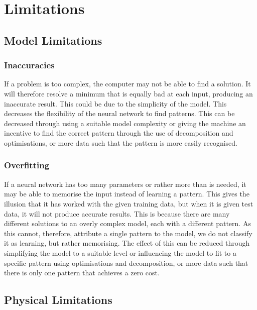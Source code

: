 
\section{Limitations}
\label{lim}

\subsection{Model Limitations}

\subsubsection{Inaccuracies}
\label{inacc}

If a problem is too complex, the computer may not be able to find a solution. It will therefore resolve a minimum that is equally bad at each input, producing an inaccurate result. This could be due to the simplicity of the model. This decreases the flexibility of the neural network to find patterns. This can be decreased through using a suitable model complexity or giving the machine an incentive to find the correct pattern through the use of \gls{decomposition} and optimisations, or more data such that the pattern is more easily recognised. \cite{ngcan}

\subsubsection{Overfitting}
\label{overfit}

If a neural network has too many parameters or rather more than is needed, it may be able to memorise the input instead of learning a pattern. This gives the illusion that it has worked with the given training data, but when it is given test data, it will not produce accurate results. This is because there are many different solutions to an overly complex model, each with a different pattern. As this cannot, therefore, attribute a single pattern to the model, we do not classify it as learning, but rather memorising. The effect of this can be reduced through simplifying the model to a suitable level or influencing the model to fit to a specific pattern using optimisations and decomposition, or more data such that there is only one pattern that achieves a zero cost.

\subsection{Physical Limitations}

